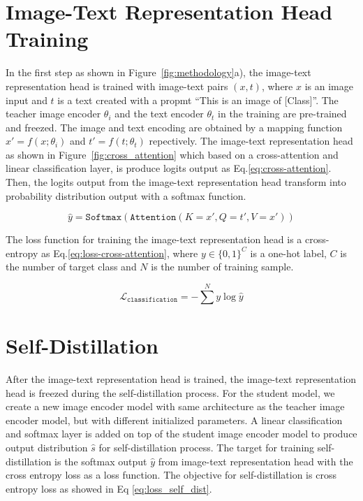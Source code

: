 \section{Image-Text Representation Head Training}
In the first step as shown in Figure~\ref{fig:methodology}a), the image-text representation head is trained with image-text pairs $(x, t)$, where $x$ is an image input and $t$ is a text created with a propmt ``This is an image of [Class]''.
The teacher image encoder $\theta_i$ and the text encoder $\theta_t$ in the training are pre-trained and freezed.
The image and text encoding are obtained by a mapping function $x' = f(x; \theta_i)$ and $t' = f(t; \theta_t)$ repectively.
The image-text representation head as shown in Figure~\ref{fig:cross_attention} which based on a cross-attention and linear classification layer, is produce logits output as Eq.\ref{eq:cross-attention}.
Then, the logits output from the image-text representation head transform into probability distribution output with a softmax function.

\begin{equation}
    \label{eq:cross-attention}
    \hat{y} = \texttt{Softmax}(\texttt{Attention}(K=x', Q=t', V=x'))
\end{equation}

The loss function for training the image-text representation head is a cross-entropy as Eq.\ref{eq:loss-cross-attention}, where $y\in\{ 0,1 \}^{C}$ is a one-hot label, $C$ is the number of target class and $N$ is the number of training sample.

\begin{equation}
    \label{eq:loss-cross-attention}
    \mathcal{L}_{\texttt{classification}} = -\sum^{N} y\log\hat{y}
\end{equation}

\section{Self-Distillation}
After the image-text representation head is trained, the image-text representation head is freezed during the self-distillation process.
For the student model, we create a new image encoder model with same architecture as the teacher image encoder model, but with different initialized parameters.
A linear classification and softmax layer is added on top of the student image encoder model to produce output distribution $\hat{s}$ for self-distillation process.
The target for training self-distillation is the softmax output $\hat{y}$ from image-text representation head with the cross entropy loss as a loss function.
The objective for self-distillation is cross entropy loss as showed in Eq \ref{eq:loss_self_dist}.


